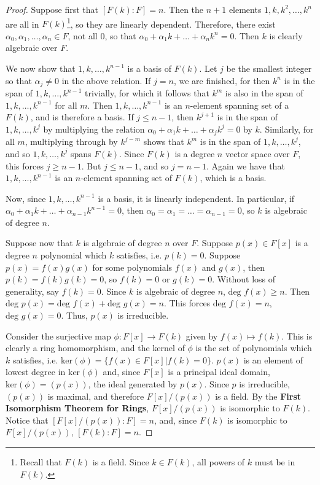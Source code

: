 \documentclass[12pt,leqno]{article}
\numberwithin{equation}{section}
\theoremstyle{plain}
\theoremstyle{definition}
\theoremstyle{remark}
\begin{document}
\begin{proof}
 Suppose first that $[F(k):F]=n$. Then the $n+1$ elements $1,k,k^2,\hdots,k^n$ are all in $F(k)$\footnote{Recall that $F(k)$ is a field. Since $k\in F(k)$, all powers of $k$ must be in $F(k)$.}, so they are linearly dependent. Therefore, there exist $\alpha_0,\alpha_1,\hdots,\alpha_n\in F$, not all 0, so that $\alpha_0+\alpha_1k+\hdots+\alpha_nk^n=0$. Then $k$ is clearly algebraic over $F$.

We now show that $1,k,\hdots,k^{n-1}$ is a basis of $F(k)$. Let $j$ be the smallest integer so that $\alpha_j\not=0$ in the above relation. If $j=n$, we are finished, for then $k^n$ is in the span of $1,k,\hdots,k^{n-1}$ trivially, for which it follows that $k^m$ is also in the span of $1,k,\hdots,k^{n-1}$ for all $m$. Then $1,k,\hdots,k^{n-1}$ is an $n$-element spanning set of a $F(k)$, and is therefore a basis. If $j\leq n-1$, then $k^{j+1}$ is in the span of $1,k,\hdots,k^j$ by multiplying the relation $\alpha_0+\alpha_1k+\hdots+\alpha_jk^j=0$ by $k$. Similarly, for all $m$, multiplying through by $k^{j-m}$ shows that $k^m$ is in the span of $1,k,\hdots,k^j$, and so $1,k,\hdots,k^j$ spans $F(k)$. Since $F(k)$ is a degree $n$ vector space over $F$, this forces $j\geq n-1$. But $j\leq n-1$, and so $j=n-1$. Again we have that $1,k,\hdots,k^{n-1}$ is an $n$-element spanning set of $F(k)$, which is a basis.

Now, since $1,k,\hdots,k^{n-1}$ is a basis, it is linearly independent. In particular, if $\alpha_0+\alpha_1k+\hdots+\alpha_{n-1}k^{n-1}=0$, then $\alpha_0=\alpha_1=\hdots=\alpha_{n-1}=0$, so $k$ is algebraic of degree $n$.
 
Suppose now that $k$ is algebraic of degree $n$ over $F$. Suppose $p(x)\in F[x]$ is a degree $n$ polynomial which $k$ satisfies, i.e. $p(k)=0$. Suppose $p(x)=f(x)g(x)$ for some polynomials $f(x)$ and $g(x)$, then $p(k)=f(k)g(k)=0$, so $f(k)=0$ or $g(k)=0$. Without loss of generality, say $f(k)=0$. Since $k$ is algebraic of degree $n$, $\text{deg }f(x)\geq n$. Then $\text{deg }p(x)=\text{deg }f(x)+\text{deg }g(x)=n$. This forces $\text{deg }f(x)=n$, $\text{deg }g(x)=0$. Thus, $p(x)$ is irreducible. 

Consider the surjective map $\phi:F[x]\to F(k)$ given by $f(x)\mapsto f(k)$. This is clearly a ring homomorphism, and the kernel of $\phi$ is the set of polynomials which $k$ satisfies, i.e. $\text{ker}(\phi)=\{f(x)\in F[x]|f(k)=0\}$. $p(x)$ is an element of lowest degree in $\text{ker}(\phi)$ and, since $F[x]$ is a principal ideal domain, $\text{ker}(\phi)=(p(x))$, the ideal generated by $p(x)$. Since $p$ is irreducible, $(p(x))$ is maximal, and therefore $F[x]/(p(x))$ is a field. By the \textbf{First Isomorphism Theorem for Rings}, $F[x]/(p(x))$ is isomorphic to $F(k)$. Notice that $[F[x]/(p(x)):F]=n$, and, since $F(k)$ is isomorphic to $F[x]/(p(x))$, $[F(k):F]=n$. 
\end{proof}
\end{document}
